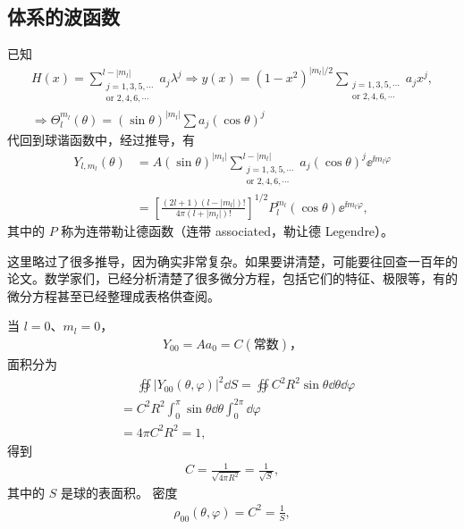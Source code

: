 \subsection{体系的波函数}
已知
\begin{align}
    H(x) = \sum_{\substack{j=1,3,5,\cdots \\\text{or } 2,4,6,\cdots}}^{l-|m_l|} a_j \lambda^j \Rightarrow y(x) = (1-x^2) ^{|m_l|/2} \sum_{\substack{j=1,3,5,\cdots \\\text{or } 2,4,6,\cdots}} a_j x^j, 
\\
    \Rightarrow \Theta_l^{m_l} (\theta) = (\sin\theta)^{|m_l|} \sum a_j (\cos\theta)^j
\end{align}
代回到球谐函数中，经过推导，有
\begin{align}
    Y_{l,m_l}(\theta) 
    &= A (\sin\theta)^{|m_l|} 
    \sum_{\substack{j=1,3,5,\cdots \\\text{or } 2,4,6,\cdots}}^{l-|m_l|}
    a_j (\cos\theta)^j \ee^{\ii m_l \varphi} \\
    &= \left[
        \frac{(2l+1) (l-|m_l|)!}
        {4\pi(l+|m_l|)!}
    \right]^{1/2}
    P_l^{m_l}(\cos\theta) \ee^{\ii m_l \varphi},
\end{align}
其中的 $P$ 称为连带勒让德函数（连带 associated，勒让德 Legendre）。

这里略过了很多推导，因为确实非常复杂。如果要讲清楚，可能要往回查一百年的论文。数学家们，已经分析清楚了很多微分方程，包括它们的特征、极限等，有的微分方程甚至已经整理成表格供查阅。

当 $l=0$、$m_l = 0$，
\begin{align}
    Y_{00} = A a_0 = C (\text{常数})，
\end{align}
面积分为
\begin{align}
    &\phantom{=}\oiint |Y_{00}(\theta, \varphi)|^2 \dd S 
    = \oiint C^2 R^2 \sin\theta \dd\theta \dd\varphi\\
    &= C^2 R^2 \int_0^\pi \sin\theta \dd\theta \int_0^{2\pi} \dd\varphi \\
    &= 4 \pi C^2 R^2 = 1, 
\end{align}
得到
\begin{align}
    C = \frac1{\sqrt{4\pi R^2}} = \frac1{\sqrt S},
\end{align}
其中的 $S$ 是球的表面积。
密度
\begin{align}
    \rho_{00}(\theta, \varphi) = C^2 = \frac1S,
\end{align}

